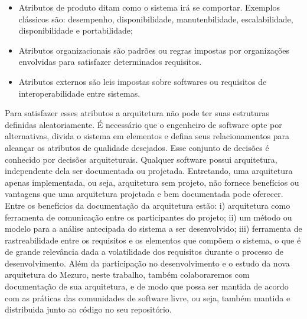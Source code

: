 \begin{itemize}
\item Atributos de produto ditam como o sistema irá se comportar. Exemplos clássicos são: desempenho, disponibilidade, manutenbilidade, escalabilidade, disponibilidade e portabilidade;
\item Atributos organizacionais são padrões ou regras impostas por organizações envolvidas para satisfazer determinados requisitos. 
\item Atributos externos são leis impostas sobre softwares ou requisitos de interoperabilidade entre sistemas.
\end{itemize}


Para satisfazer esses atributos a arquitetura não pode ter suas estruturas definidas aleatoriamente. É necessário que o engenheiro de software opte por alternativas, divida o sistema em elementos e defina seus relacionamentos para alcançar os atributos de qualidade desejados. Esse conjunto de decisões é conhecido por decisões arquiteturais.
Qualquer software possui arquitetura, independente dela ser documentada ou projetada. Entretando, uma arquitetura apenas implementada, ou seja, arquitetura sem projeto, não fornece benefícios ou vantagens que uma arquitetura projetada e bem documentada pode oferecer. Entre os benefícios da documentação da arquitetura estão: i) arquitetura como ferramenta de comunicação entre os participantes do projeto; ii) um método ou modelo para a análise antecipada do sistema a ser desenvolvido; iii) ferramenta de rastreabilidade entre os requisitos e os elementos que compõem o sistema, o que é de grande relevância dada a volatilidade dos requisitos durante o processo de desenvolvimento.
%
Além da participação no desenvolvimento e o estudo da nova arquitetura do Mezuro,
neste trabalho, também colaboraremos com documentação de sua arquitetura, e de modo
que possa ser mantida de acordo com as práticas das comunidades de software livre,
ou seja, também mantida e distribuida junto ao código no seu repositório.




